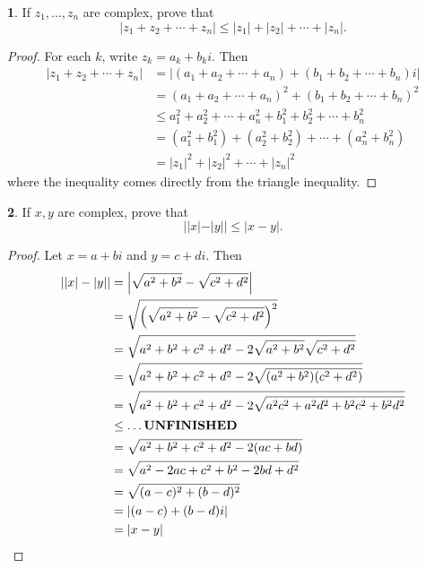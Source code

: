 \documentclass[12pt]{article}
\theoremstyle{definition}
\newtheorem{ex}{}
\begin{document}
\begin{ex}
	If $z_1, \dots, z_n$ are complex, prove that \begin{equation*}
		|z_1 + z_2 + \cdots + z_n| \leq |z_1| + |z_2| + \cdots + |z_n|.
	\end{equation*}
\end{ex}
\begin{proof}
	For each $k$, write $z_k = a_k + b_ki$.
	Then \begin{align*}
		|z_1 + z_2 + \cdots + z_n| & = \left|(a_1 + a_2 + \cdots + a_n) + (b_1 + b_2 + \cdots + b_n)i\right| \\
		                           & = (a_1 + a_2 + \cdots + a_n)^2 + (b_1 + b_2 + \cdots + b_n)^2           \\
		                           & \leq a_1^2 + a_2^2 + \cdots + a_n^2 + b_1^2 + b_2^2 + \cdots + b_n^2    \\
		                           & = (a_1^2 + b_1^2) + (a_2^2 + b_2^2) + \cdots + (a_n^2 + b_n^2)          \\
		                           & = |z_1|^2 + |z_2|^2 + \cdots + |z_n|^2
	\end{align*}
	where the inequality comes directly from the triangle inequality.
\end{proof}

\begin{ex}
	If $x, y$ are complex, prove that \begin{equation*}
		||x| - |y|| \leq |x - y|.
	\end{equation*}
\end{ex}
\begin{proof}
	Let $x = a + bi$ and $y = c + di$.
	Then \begin{align*}
		||x| - |y|| & = \left|\sqrt{a^2 + b^2} - \sqrt{c^2 + d^2}\right|                         \\
		            & = \sqrt{\left(\sqrt{a^2 + b^2} - \sqrt{c^2 + d^2}\right)^2}                \\
		            & = \sqrt{a^2 + b^2 + c^2 + d^2 - 2\sqrt{a^2 + b^2}\sqrt{c^2 + d^2}}         \\
		            & = \sqrt{a^2 + b^2 + c^2 + d^2 - 2\sqrt{(a^2 + b^2)(c^2 + d^2)}}            \\
		            & = \sqrt{a^2 + b^2 + c^2 + d^2 - 2\sqrt{a^2c^2 + a^2d^2 + b^2c^2 + b^2d^2}} \\
		            & \leq \dots \text{\textbf{UNFINISHED}}                                      \\
		            & = \sqrt{a^2 + b^2 + c^2 + d^2 - 2(ac + bd)}                                \\
		            & = \sqrt{a^2 - 2ac + c^2 + b^2 - 2bd + d^2}                                 \\
		            & = \sqrt{(a - c)^2 + (b - d)^2}                                             \\
		            & = |(a - c) + (b - d)i|                                                     \\
		            & = |x - y|
	\end{align*}
\end{proof}
\end{document}
